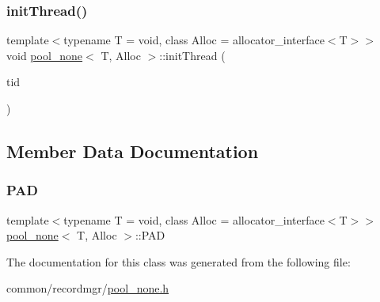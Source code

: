 \mbox{\label{classpool__none_a60aa791c93ff63d74dc1e247aa56683d}} 
\subsubsection{\texorpdfstring{init\+Thread()}{initThread()}}
{\footnotesize\ttfamily template$<$typename T  = void, class Alloc  = allocator\+\_\+interface$<$\+T$>$$>$ \\
void \hyperlink{classpool__none}{pool\+\_\+none}$<$ T, Alloc $>$\+::init\+Thread (\begin{DoxyParamCaption}\item[{const int}]{tid }\end{DoxyParamCaption})\hspace{0.3cm}{\ttfamily [inline]}}



\subsection{Member Data Documentation}
\mbox{\label{classpool__none_a071df42d9f83a773764e034b0cbdaf9f}} 
\subsubsection{\texorpdfstring{P\+AD}{PAD}}
{\footnotesize\ttfamily template$<$typename T  = void, class Alloc  = allocator\+\_\+interface$<$\+T$>$$>$ \\
\hyperlink{classpool__none}{pool\+\_\+none}$<$ T, Alloc $>$\+::P\+AD}



The documentation for this class was generated from the following file\+:\begin{DoxyCompactItemize}
\item 
common/recordmgr/\hyperlink{pool__none_8h}{pool\+\_\+none.\+h}\end{DoxyCompactItemize}
